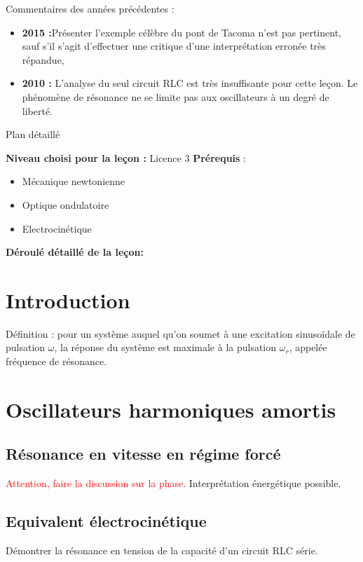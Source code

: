 \begin{reportBlock}{Commentaires des années précédentes :}
    \begin{itemize}
        \item \textbf{2015 :}Présenter l’exemple célèbre du pont de Tacoma n’est pas pertinent, sauf s’il s’agit d’effectuer une critique d’une interprétation erronée très répandue,
        \item \textbf{2010 :} L’analyse du seul circuit RLC est très insuffisante pour cette leçon. Le phénomène de résonance ne se limite pas aux oscillateurs à un degré de liberté.
    \end{itemize}
\end{reportBlock}
\begin{reportBlock}{Plan détaillé}

  \textbf{Niveau choisi pour la leçon :} Licence 3
  \newline
  \textbf{Prérequis} : \begin{itemize}
      \item Mécanique newtonienne
      \item Optique ondulatoire
      \item Electrocinétique
  \end{itemize}

  \textbf{Déroulé détaillé de la leçon: }  
  
\section*{Introduction}
Définition : pour un système auquel qu'on soumet à une excitation sinusoïdale de pulsation $\omega$, la réponse du système est maximale à la pulsation $\omega_r$, appelée fréquence de résonance.

\section{Oscillateurs harmoniques amortis}

\subsection{Résonance en vitesse en régime forcé} 

\textcolor{red}{Attention, faire la discussion sur la phase}. Interprétation énergétique possible.

\subsection{Equivalent électrocinétique}
Démontrer la résonance en tension de la capacité d'un circuit RLC série.\\


\end{reportBlock}
